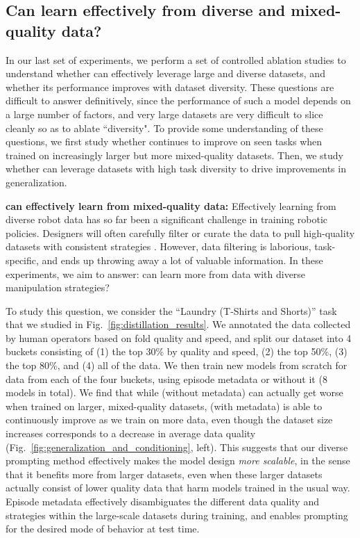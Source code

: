 \subsection{Can \texorpdfstring{\MethodName{}}{pi0.7} learn effectively from diverse and mixed-quality data?}
\label{sec:scaling}
In our last set of experiments, we perform a set of controlled ablation studies to understand whether \MethodName{} can effectively leverage large and diverse datasets, and whether its performance improves with dataset diversity. These questions are difficult to answer definitively, since the performance of such a model depends on a large number of factors, and very large datasets are very difficult to slice cleanly so as to ablate ``diversity". To provide some understanding of these questions, we first study whether \MethodName{} continues to improve on seen tasks when trained on increasingly larger but more mixed-quality datasets. Then, we study whether \MethodName{} can leverage datasets with high task diversity to drive improvements in generalization.

\noindent \textbf{\MethodName{} can effectively learn from mixed-quality data: }
Effectively learning from diverse robot data has so far been a significant challenge in training robotic policies. Designers will often carefully filter or curate the data to pull high-quality datasets with consistent strategies \cite{hejna2025robot, li2025gr}. However, data filtering is laborious, task-specific, and ends up throwing away a lot of valuable information. In these experiments, we aim to answer: can \MethodName{} learn more from data with diverse manipulation strategies?

To study this question, we consider the ``Laundry (T-Shirts and Shorts)'' task that we studied in Fig.~\ref{fig:distillation_results}. We annotated the data collected by human operators based on fold quality and speed, and split our dataset into 4 buckets consisting of (1) the top 30\% by quality and speed, (2) the top 50\%, (3) the top 80\%, and (4) all of the data. We then train new \MethodName{} models from scratch for data from each of the four buckets, using episode metadata or without it (8 models in total).
We find that while \MethodName{} (without metadata) can actually get worse when trained on larger, mixed-quality datasets, \MethodName{} (with metadata) is able to continuously improve as we train on more data, even though the dataset size increases corresponds to a decrease in average data quality (Fig.~\ref{fig:generalization_and_conditioning}, left). This suggests that our diverse prompting method effectively makes the model design \emph{more scalable}, in the sense that it benefits more from larger datasets, even when these larger datasets actually consist of lower quality data that harm models trained in the usual way. Episode metadata effectively disambiguates the different data quality and strategies within the large-scale datasets during \MethodName{} training, and enables prompting for the desired mode of behavior at test time.

